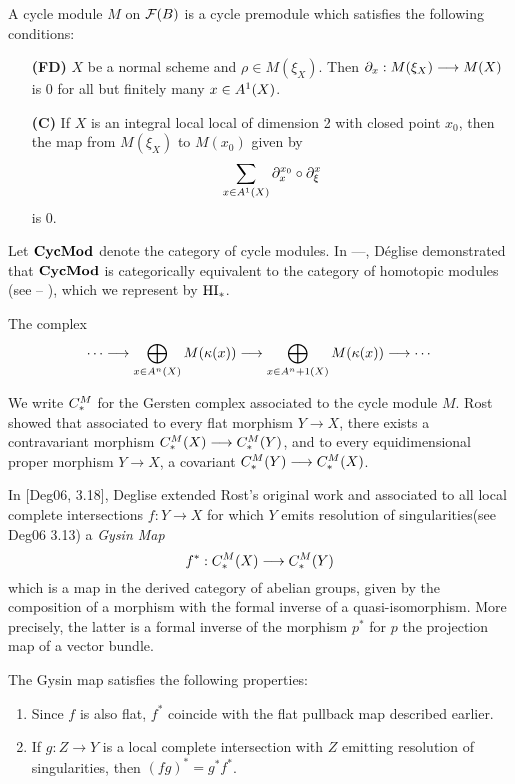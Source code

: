 \begin{definition}
A cycle module $M$ on $\fields(B)$ is a cycle premodule which
satisfies the following conditions:

\begin{enumerate}
\item[\textbf{(FD)}]  
$X$ be a normal scheme and $\rho \in M(\xi_X)$. Then $\res{x}: 
M(\xi_X) \to M(X)$ is 0 for all but finitely many $x \in 
\subsch{1}{X}$.

\item[\textbf{(C)}]  If $X$ is an integral
local local of dimension 2 with closed point $x_0$, then the map 
from $M(\xi_X)$ to $M(x_0)$ given by
\[
\sum_{x \in \subsch{1}{X}} \ptres{x_0}{x} \comp \ptres{x}{\xi}
\]
is 0.
\end{enumerate}
\end{definition}

Let $\CycMod$ denote the category of cycle modules. In ---,
D\'eglise demonstrated that $\CycMod$ is categorically 
equivalent to the category of homotopic modules (see -- ), which
we represent by $\HI_*$. 

\vskip 10pt
The complex \[\gersseq{M}\]

We write $\gcmplx{M}$ for the Gersten complex associated to the 
cycle module $M$. Rost showed that associated to every flat 
morphism $Y \to X$, there exists a contravariant morphism 
$\gcmplx{M}(X) \to \gcmplx{M}(Y)$, and to every equidimensional 
proper morphism $Y \to X$, a covariant $\gcmplx{M}(Y) \to 
\gcmplx{M}(X)$.

In [Deg06, 3.18], Deglise extended Rost's original work and 
associated to all local complete intersections $f: Y \to X$ for
which $Y$ emits resolution of singularities(see Deg06 3.13) a 
\emph{Gysin Map} 
\[
   f^*: \gcmplx{M}(X) \to \gcmplx{M}(Y)
\]
which is a map in the derived category of abelian groups, given 
by the composition of a morphism with the formal inverse of a 
quasi-isomorphism. More precisely, the latter is a formal inverse 
of the morphism $p^*$ for $p$ the projection map of a vector 
bundle. 

The Gysin map satisfies the following properties:
\begin{enumerate}
\item Since $f$ is also flat, $f^*$ coincide with the flat 
pullback map described earlier.

\item If $g: Z \to Y$ is a local complete intersection with $Z$
emitting resolution of singularities, then $(fg)^* = g^*f^*$.
\end{enumerate}

